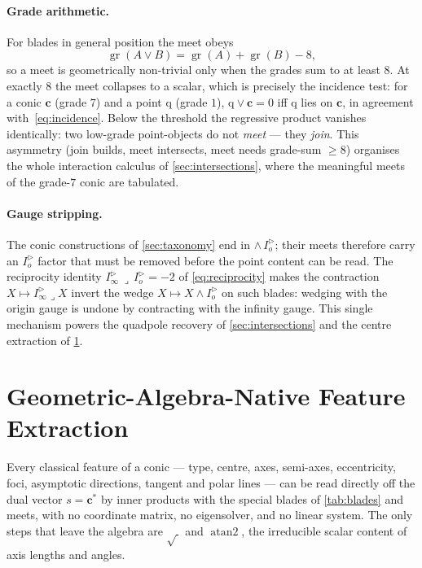 \documentclass{birkjour}
\theoremstyle{definition}
\theoremstyle{remark}
\newcommand{\Iod}{I_o^{\triangleright}}      %
\newcommand{\Iinfd}{I_\infty^{\triangleright}}%
\newcommand{\meet}{\vee}
\newcommand{\joinp}{\wedge}
\begin{document}
\paragraph{Grade arithmetic.}
For blades in general position the meet obeys
\begin{equation}\label{eq:meet-grade}
  \operatorname{gr}(A \meet B) = \operatorname{gr}(A) + \operatorname{gr}(B) - 8 ,
\end{equation}
so a meet is geometrically non-trivial only when the grades sum to at least
$8$. At exactly $8$ the meet collapses to a scalar, which is precisely the
incidence test: for a conic $\mathbf{c}$ (grade $7$) and a point $\mathrm{q}$
(grade $1$), $\mathrm{q}\meet\mathbf{c}=0$ iff $\mathrm{q}$ lies on
$\mathbf{c}$, in agreement with~\eqref{eq:incidence}. Below the threshold the
regressive product vanishes identically: two low-grade point-objects do not
\emph{meet} --- they \emph{join}. This asymmetry (join builds, meet
intersects, meet needs grade-sum $\ge 8$) organises the whole interaction
calculus of \cref{sec:intersections}, where the meaningful meets of the
grade-$7$ conic are tabulated.

\paragraph{Gauge stripping.}
The conic constructions of \cref{sec:taxonomy} end in $\joinp\,\Iod$; their
meets therefore carry an $\Iod$ factor that must be removed before the point
content can be read. The reciprocity identity $\Iinfd\,\lrcorner\,\Iod = -2$
of \cref{eq:reciprocity} makes the contraction $X\mapsto\Iinfd\lrcorner X$
invert the wedge $X\mapsto X\joinp\Iod$ on such blades: wedging with the
origin gauge is undone by contracting with the infinity gauge. This single
mechanism powers the quadpole recovery of \cref{sec:intersections} and the
centre extraction of \cref{sec:extraction}.

\section{Geometric-Algebra-Native Feature Extraction}
\label{sec:extraction}
Every classical feature of a conic --- type, centre, axes, semi-axes,
eccentricity, foci, asymptotic directions, tangent and polar lines --- can be
read directly off the dual vector $s=\mathbf{c}^{*}$ by inner products with
the special blades of \cref{tab:blades} and meets, with no coordinate matrix,
no eigensolver, and no linear system. The only steps that leave the algebra
are $\sqrt{\ }$ and $\operatorname{atan2}$, the irreducible scalar content of
axis lengths and angles.
\end{document}
